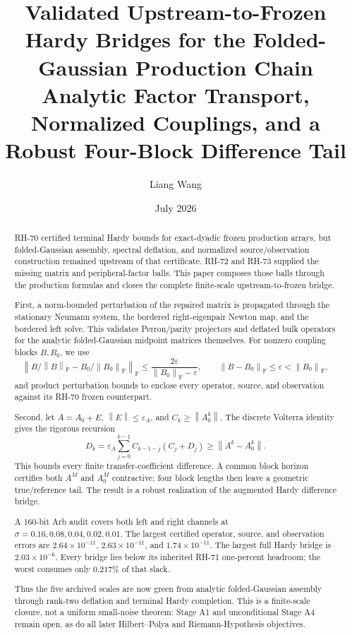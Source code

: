 \documentclass[11pt]{article}
\title{Validated Upstream-to-Frozen Hardy Bridges for the Folded-Gaussian Production Chain\\
\large Analytic Factor Transport, Normalized Couplings, and a Robust Four-Block Difference Tail}
\author{Liang Wang}
\date{July 2026}
\theoremstyle{definition}
\newcommand{\norm}[1]{\left\lVert#1\right\rVert}
\newcommand{\F}{\mathrm F}
\begin{document}
\maketitle

\begin{abstract}
RH-70 certified terminal Hardy bounds for exact-dyadic frozen production
arrays, but folded-Gaussian assembly, spectral deflation, and normalized
source/observation construction remained upstream of that certificate.  RH-72
and RH-73 supplied the missing matrix and peripheral-factor balls.  This paper
composes those balls through the production formulas and closes the complete
finite-scale upstream-to-frozen bridge.

First, a norm-bounded perturbation of the repaired matrix is propagated through
the stationary Neumann system, the bordered right-eigenpair Newton map, and the
bordered left solve.  This validates Perron/parity projectors and deflated bulk
operators for the analytic folded-Gaussian midpoint matrices themselves.  For
nonzero coupling blocks $B,B_0$, we use
\[
 \norm{B/\norm B_{\F}-B_0/\norm{B_0}_{\F}}_{\F}
 \le \frac{2\varepsilon}{\norm{B_0}_{\F}-\varepsilon},
 \qquad \norm{B-B_0}_{\F}\le\varepsilon<\norm{B_0}_{\F},
\]
and product perturbation bounds to enclose every operator, source, and
observation against its RH-70 frozen counterpart.

Second, let $A=A_0+E$, $\norm E\le\varepsilon_A$, and
$C_k\ge\norm{A_0^k}$.  The discrete Volterra identity gives the rigorous
recursion
\[
 D_k=\varepsilon_A\sum_{j=0}^{k-1}C_{k-1-j}(C_j+D_j)
 \ge\norm{A^k-A_0^k}.
\]
This bounds every finite transfer-coefficient difference.  A common block
horizon certifies both $A^M$ and $A_0^M$ contractive; four block lengths then
leave a geometric true/reference tail.  The result is a robust realization of
the augmented Hardy difference bridge.

A 160-bit Arb audit covers both left and right channels at
$\sigma=0.16,0.08,0.04,0.02,0.01$.  The largest certified operator, source,
and observation errors are $2.64\times10^{-11}$,
$2.63\times10^{-11}$, and $1.74\times10^{-11}$.  The largest full Hardy
bridge is $2.03\times10^{-6}$.  Every bridge lies below its inherited RH-71
one-percent headroom; the worst consumes only $0.217\%$ of that slack.

Thus the five archived scales are now green from analytic folded-Gaussian
assembly through rank-two deflation and terminal Hardy completion.  This is a
finite-scale closure, not a uniform small-noise theorem: Stage A1 and
unconditional Stage A4 remain open, as do all later Hilbert--Polya and
Riemann-Hypothesis objectives.
\end{abstract}
\end{document}
